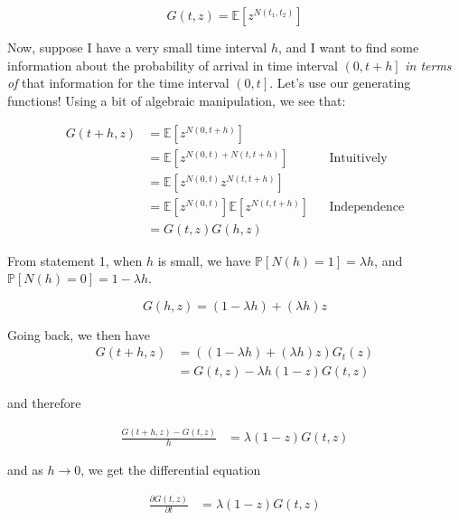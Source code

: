 \documentclass{article}
\begin{document}
\begin{equation}
G(t, z) = \mathbb{E}[z^{N(t_1, t_2)}]
\end{equation}


Now, suppose I have a very small time interval $h$, and I want to find some information about the probability of arrival in time interval $\left(0, t+h\right]$ \textit{in terms of} that information for the time interval $\left(0, t\right]$. Let's use our generating functions! Using a bit of algebraic manipulation, we see that:


\begin{align*}
G(t+h,z) &= \mathbb{E}[z^{N(0, t+h)}] \\
&= \mathbb{E}[z^{N(0, t) + N(t, t+h)}] && \text{Intuitively} \\
&= \mathbb{E}[z^{N(0, t)} z^{N(t, t+h)}] \\
&= \mathbb{E}[z^{N(0, t)}]  \mathbb{E}[z^{N(t, t+h)}] && \text{Independence} \\
&= G(t,z) G(h,z)
\end{align*}


From statement 1, when $h$ is small, we have $\mathbb{P}[N(h) = 1] = \lambda h$, and $\mathbb{P}[N(h) = 0] = 1 - \lambda h$. 

\begin{equation}
G(h,z) = (1 - \lambda h) + (\lambda h)z
\end{equation}

Going back, we then have 
\begin{align*}
G(t+h,z) &= ((1 - \lambda h) + (\lambda h)z) G_t(z) \\
&= G(t,z) - \lambda h(1-z) G(t,z)
\end{align*}

and therefore

\begin{align*}
\frac{G(t+h,z) - G(t,z)}{h} &= \lambda (1-z) G(t,z)
\end{align*}

and as $h \rightarrow 0$, we get the differential equation 

\begin{align*}
\frac{\partial G(t,z)}{\partial t} &= \lambda (1-z) G(t,z)
\end{align*}

\end{document}
